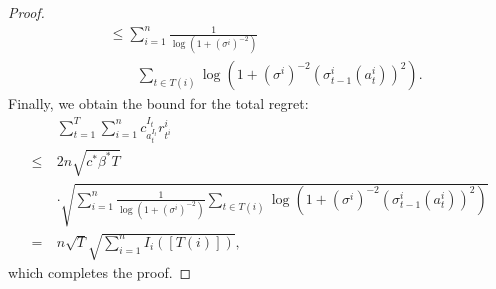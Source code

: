 \documentclass[letterpaper]{vldb}
\begin{document}
\begin{proof}
\begin{align*}
    & \le \sum_{i=1}^n \frac{1}{\log\left(1 + (\sigma^i)^{-2}\right)}\\
    &\qquad \sum_{t\in T(i)} \log\left(1 + (\sigma^i)^{-2} (\sigma^i_{t-1}(a^i_{t}))^2\right).
  \end{align*}
  Finally, we obtain the bound for the total regret:
  \begin{align*}
    & \sum_{t=1}^T \sum_{i=1}^n c^{I_t}_{a^{I_t}_t} r^i_{t^i}\\
     \le \ & 2n \sqrt{c^\ast \beta^\ast T}\\
    & \cdot \sqrt{\sum_{i=1}^n \frac{1}{\log\left(1 + (\sigma^i)^{-2}\right)} \sum_{t\in T(i)} \log\left(1 + (\sigma^i)^{-2} (\sigma^i_{t-1}(a^i_{t}))^2\right)}\\
    =\ & n \sqrt{T} \sqrt{\sum_{i=1}^n I_i([T(i)])},
  \end{align*}
 which completes the proof.
\end{proof}

\fi
\end{document}
